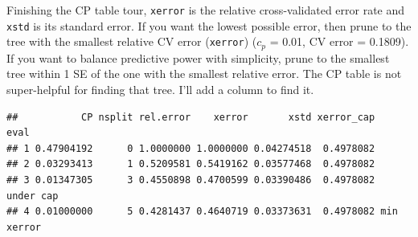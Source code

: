 \documentclass[]{book}
\newenvironment{Shaded}{\begin{snugshade}}{\end{snugshade}}
\newcommand{\DataTypeTok}[1]{\textcolor[rgb]{0.13,0.29,0.53}{#1}}
\newcommand{\DecValTok}[1]{\textcolor[rgb]{0.00,0.00,0.81}{#1}}
\newcommand{\KeywordTok}[1]{\textcolor[rgb]{0.13,0.29,0.53}{\textbf{#1}}}
\newcommand{\NormalTok}[1]{#1}
\newcommand{\OperatorTok}[1]{\textcolor[rgb]{0.81,0.36,0.00}{\textbf{#1}}}
\newcommand{\OtherTok}[1]{\textcolor[rgb]{0.56,0.35,0.01}{#1}}
\newcommand{\StringTok}[1]{\textcolor[rgb]{0.31,0.60,0.02}{#1}}
\begin{document}
Finishing the CP table tour, \texttt{xerror} is the relative cross-validated error rate and \texttt{xstd} is its standard error. If you want the lowest possible error, then prune to the tree with the smallest relative CV error (\texttt{xerror}) (\(c_p\) = 0.01, CV error = 0.1809). If you want to balance predictive power with simplicity, prune to the smallest tree within 1 SE of the one with the smallest relative error. The CP table is not super-helpful for finding that tree. I'll add a column to find it.

\begin{Shaded}
\end{Shaded}

\begin{verbatim}
##           CP nsplit rel.error    xerror       xstd xerror_cap       eval
## 1 0.47904192      0 1.0000000 1.0000000 0.04274518  0.4978082           
## 2 0.03293413      1 0.5209581 0.5419162 0.03577468  0.4978082           
## 3 0.01347305      3 0.4550898 0.4700599 0.03390486  0.4978082  under cap
## 4 0.01000000      5 0.4281437 0.4640719 0.03373631  0.4978082 min xerror
\end{verbatim}
\end{document}
